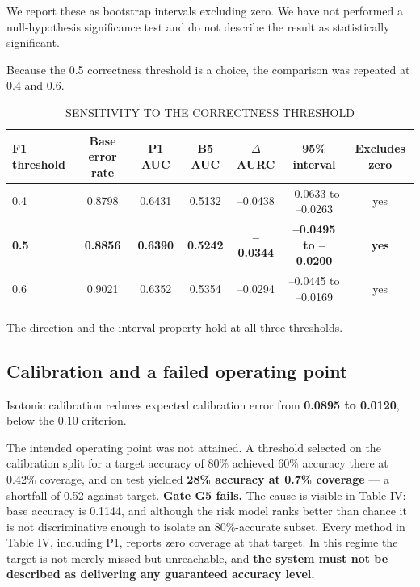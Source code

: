 \documentclass[conference]{IEEEtran}
\begin{document}
We report these as bootstrap intervals excluding zero. We have not performed a null-hypothesis significance test and do not describe the result as statistically significant.

Because the 0.5 correctness threshold is a choice, the comparison was repeated at 0.4 and 0.6.

\begin{table}[t]\centering\caption{SENSITIVITY TO THE CORRECTNESS THRESHOLD}\label{tab:5}\footnotesize
\begin{tabular}{lcccccc}\hline
\textbf{F1 threshold} & \textbf{Base error rate} & \textbf{P1 AUC} & \textbf{B5 AUC} & \textbf{$\Delta$AURC} & \textbf{95\% interval} & \textbf{Excludes zero} \\ \hline
0.4 & 0.8798 & 0.6431 & 0.5132 & --0.0438 & --0.0633 to --0.0263 & yes \\
\textbf{0.5} & \textbf{0.8856} & \textbf{0.6390} & \textbf{0.5242} & \textbf{--0.0344} & \textbf{--0.0495 to --0.0200} & \textbf{yes} \\
0.6 & 0.9021 & 0.6352 & 0.5354 & --0.0294 & --0.0445 to --0.0169 & yes \\
\hline\end{tabular}\end{table}

The direction and the interval property hold at all three thresholds.

\subsection{Calibration and a failed operating point}

Isotonic calibration reduces expected calibration error from \textbf{0.0895 to 0.0120}, below the 0.10 criterion.

The intended operating point was not attained. A threshold selected on the calibration split for a target accuracy of 80\% achieved 60\% accuracy there at 0.42\% coverage, and on test yielded \textbf{28\% accuracy at 0.7\% coverage} --- a shortfall of 0.52 against target. \textbf{Gate G5 fails.} The cause is visible in Table IV: base accuracy is 0.1144, and although the risk model ranks better than chance it is not discriminative enough to isolate an 80\%-accurate subset. Every method in Table IV, including P1, reports zero coverage at that target. In this regime the target is not merely missed but unreachable, and \textbf{the system must not be described as delivering any guaranteed accuracy level.}
\end{document}
